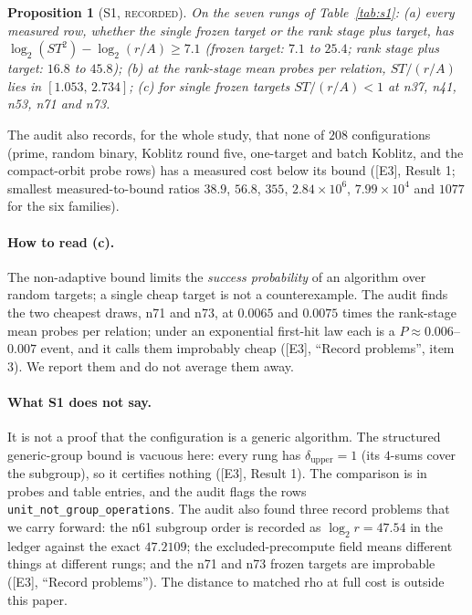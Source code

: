 \documentclass[10pt,a4paper]{article}
\newcommand{\ev}[1]{\textup{[#1]}}
\newtheorem{proposition}[theorem]{Proposition}
\theoremstyle{definition}
\theoremstyle{remark}
\begin{document}
\begin{proposition}[S1, \textsc{recorded}]
\label{prop:s1}
On the seven rungs of Table~\ref{tab:s1}:
(a) every measured row, whether the single frozen target or the rank stage plus
target, has $\log_2(ST^2)-\log_2(r/A)\ge 7.1$ (frozen target: $7.1$ to $25.4$;
rank stage plus target: $16.8$ to $45.8$);
(b) at the rank-stage mean probes per relation, $ST/(r/A)$ lies in
$[1.053,\,2.734]$;
(c) for single frozen targets $ST/(r/A)<1$ at n37, n41, n53, n71 and n73.
\end{proposition}

The audit also records, for the whole study, that none of $208$ configurations
(prime, random binary, Koblitz round five, one-target and batch Koblitz, and the
compact-orbit probe rows) has a measured cost below its bound (\ev{E3}, Result 1;
smallest measured-to-bound ratios $38.9$, $56.8$, $355$, $2.84\times10^{6}$,
$7.99\times10^{4}$ and $1077$ for the six families).

\paragraph{How to read (c).}
The non-adaptive bound limits the \emph{success probability} of an algorithm over
random targets; a single cheap target is not a counterexample. The audit finds the
two cheapest draws, n71 and n73, at $0.0065$ and $0.0075$ times the rank-stage mean
probes per relation; under an exponential first-hit law each is a
$P\approx0.006$--$0.007$ event, and it calls them improbably cheap (\ev{E3},
``Record problems'', item 3). We report them and do not average them away.

\paragraph{What S1 does not say.}
It is not a proof that the configuration is a generic algorithm. The structured
generic-group bound is vacuous here: every rung has $\delta_{\mathrm{upper}}=1$
(its $4$-sums cover the subgroup), so it certifies nothing (\ev{E3}, Result 1).
The comparison is in probes and table entries, and the audit flags the rows
\texttt{unit\_not\_group\_operations}. The audit also found three record problems
that we carry forward: the n61 subgroup order is recorded as $\log_2 r=47.54$ in
the ledger against the exact $47.2109$; the excluded-precompute field means
different things at different rungs; and the n71 and n73 frozen targets are
improbable (\ev{E3}, ``Record problems''). The distance to matched rho at full
cost is outside this paper.
\end{document}
